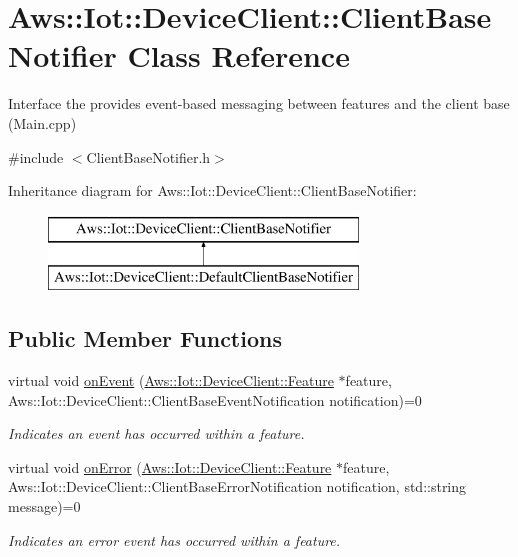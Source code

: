 \hypertarget{class_aws_1_1_iot_1_1_device_client_1_1_client_base_notifier}{}\section{Aws\+:\+:Iot\+:\+:Device\+Client\+:\+:Client\+Base\+Notifier Class Reference}
\label{class_aws_1_1_iot_1_1_device_client_1_1_client_base_notifier}


Interface the provides event-\/based messaging between features and the client base (Main.\+cpp)  




{\ttfamily \#include $<$Client\+Base\+Notifier.\+h$>$}

Inheritance diagram for Aws\+:\+:Iot\+:\+:Device\+Client\+:\+:Client\+Base\+Notifier\+:\begin{figure}[H]
\begin{center}
\leavevmode
\includegraphics[height=2.000000cm]{class_aws_1_1_iot_1_1_device_client_1_1_client_base_notifier}
\end{center}
\end{figure}
\subsection*{Public Member Functions}
\begin{DoxyCompactItemize}
\item 
virtual void \hyperlink{class_aws_1_1_iot_1_1_device_client_1_1_client_base_notifier_ae892fac9b0a778d8882bf56cb88ec26d}{on\+Event} (\hyperlink{class_aws_1_1_iot_1_1_device_client_1_1_feature}{Aws\+::\+Iot\+::\+Device\+Client\+::\+Feature} $\ast$feature, Aws\+::\+Iot\+::\+Device\+Client\+::\+Client\+Base\+Event\+Notification notification)=0
\begin{DoxyCompactList}\small\item\em Indicates an event has occurred within a feature. \end{DoxyCompactList}\item 
virtual void \hyperlink{class_aws_1_1_iot_1_1_device_client_1_1_client_base_notifier_a4b1f9d16f18965cccb96de1518a53abe}{on\+Error} (\hyperlink{class_aws_1_1_iot_1_1_device_client_1_1_feature}{Aws\+::\+Iot\+::\+Device\+Client\+::\+Feature} $\ast$feature, Aws\+::\+Iot\+::\+Device\+Client\+::\+Client\+Base\+Error\+Notification notification, std\+::string message)=0
\begin{DoxyCompactList}\small\item\em Indicates an error event has occurred within a feature. \end{DoxyCompactList}\end{DoxyCompactItemize}


